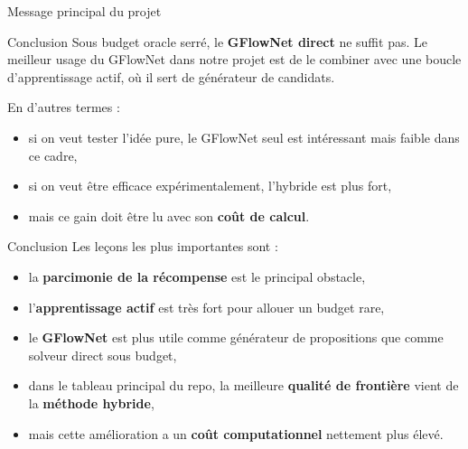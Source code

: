 \documentclass[aspectratio=169,10pt]{beamer}
\begin{document}
\begin{frame}{Message principal du projet}
\justifying
\begin{block}{Conclusion}
Sous budget oracle serré, le \textbf{GFlowNet direct} ne suffit pas.
Le meilleur usage du GFlowNet dans notre projet est de le combiner avec une
boucle d'apprentissage actif, où il sert de générateur de candidats.
\end{block}

\vspace{0.5em}
En d'autres termes :
\begin{itemize}
  \item si on veut tester l'idée pure, le GFlowNet seul est intéressant mais
  faible dans ce cadre,
  \item si on veut être efficace expérimentalement, l'hybride est plus fort,
  \item mais ce gain doit être lu avec son \textbf{coût de calcul}.
\end{itemize}
\end{frame}

\begin{frame}{Conclusion}
\justifying
Les leçons les plus importantes sont :

\begin{itemize}
  \item la \textbf{parcimonie de la récompense} est le principal obstacle,
  \item l'\textbf{apprentissage actif} est très fort pour allouer un budget rare,
  \item le \textbf{GFlowNet} est plus utile comme générateur de propositions
  que comme solveur direct sous budget,
  \item dans le tableau principal du repo, la meilleure \textbf{qualité de
  frontière} vient de la \textbf{méthode hybride},
  \item mais cette amélioration a un \textbf{coût computationnel} nettement plus
  élevé.
\end{itemize}
\end{frame}
\end{document}
